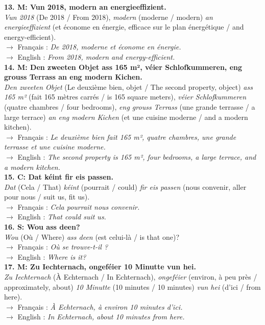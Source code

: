 \noindent\textbf{13. M: Vun 2018, modern an energieeffizient.}\\
\textit{Vun 2018} (De 2018 / From 2018), \textit{modern} (moderne / modern) \textit{an energieeffizient} (et économe en énergie, efficace sur le plan énergétique / and energy-efficient).\\
$\rightarrow$ Français : \textit{De 2018, moderne et économe en énergie.}\\
$\rightarrow$ English : \textit{From 2018, modern and energy-efficient.}\\[0.5em]

\noindent\textbf{14. M: Den zweeten Objet ass 165 m², véier Schlofkummeren, eng grouss Terrass an eng modern Kichen.}\\
\textit{Den zweeten Objet} (Le deuxième bien, objet / The second property, object) \textit{ass 165 m²} (fait 165 mètres carrés / is 165 square meters), \textit{véier Schlofkummeren} (quatre chambres / four bedrooms), \textit{eng grouss Terrass} (une grande terrasse / a large terrace) \textit{an eng modern Kichen} (et une cuisine moderne / and a modern kitchen).\\
$\rightarrow$ Français : \textit{Le deuxième bien fait 165 m², quatre chambres, une grande terrasse et une cuisine moderne.}\\
$\rightarrow$ English : \textit{The second property is 165 m², four bedrooms, a large terrace, and a modern kitchen.}\\[0.5em]

\noindent\textbf{15. C: Dat kéint fir eis passen.}\\
\textit{Dat} (Cela / That) \textit{kéint} (pourrait / could) \textit{fir eis passen} (nous convenir, aller pour nous / suit us, fit us).\\
$\rightarrow$ Français : \textit{Cela pourrait nous convenir.}\\
$\rightarrow$ English : \textit{That could suit us.}\\[0.5em]

\noindent\textbf{16. S: Wou ass deen?}\\
\textit{Wou} (Où / Where) \textit{ass deen} (est celui-là / is that one)?\\
$\rightarrow$ Français : \textit{Où se trouve-t-il ?}\\
$\rightarrow$ English : \textit{Where is it?}\\[0.5em]

\noindent\textbf{17. M: Zu Iechternach, ongeféier 10 Minutte vun hei.}\\
\textit{Zu Iechternach} (À Echternach / In Echternach), \textit{ongeféier} (environ, à peu près / approximately, about) \textit{10 Minutte} (10 minutes / 10 minutes) \textit{vun hei} (d'ici / from here).\\
$\rightarrow$ Français : \textit{À Echternach, à environ 10 minutes d'ici.}\\
$\rightarrow$ English : \textit{In Echternach, about 10 minutes from here.}\\[0.5em]

